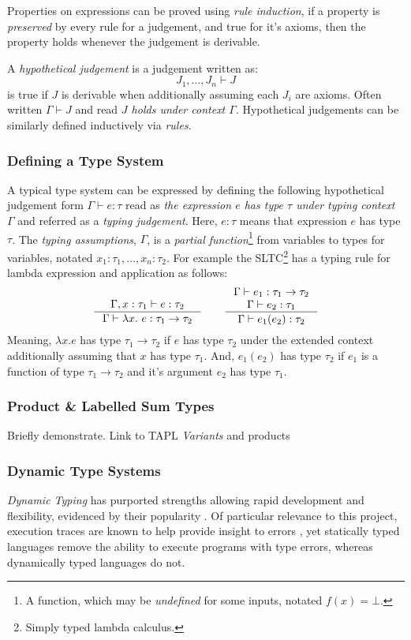 Properties on expressions can be proved using \textit{rule induction}, if a property is \textit{preserved} by every rule for a judgement, and true for it's axioms, then the property holds whenever the judgement is derivable.

A \textit{hypothetical judgement} is a judgement written as: 
\[J_1, \dots, J_n \vdash J\]
is true if $J$ is derivable when additionally assuming each $J_i$ are axioms. Often written $\Gamma \vdash J$ and read \textit{$J$ holds under context $\Gamma$}. Hypothetical judgements can be similarly defined inductively via \textit{rules}.

\subsubsection{Defining a Type System}\label{sec:TypingJudgements}
A typical type system can be expressed by defining the following hypothetical judgement form $\Gamma \vdash e : \tau$ read as \textit{the expression $e$ has type $\tau$ under typing context $\Gamma$} and referred as a \textit{typing judgement}. Here, $e : \tau$ means that expression $e$ has type $\tau$.  The \textit{typing assumptions}, $\Gamma$, is a \textit{partial function}\footnote{A function, which may be \textit{undefined} for some inputs, notated $f(x) = \bot$.} \cite{PartialFunctions} from variables to types for variables, notated $x_1 : \tau_1, \dots, x_n : \tau_2$. For example the SLTC\footnote{Simply typed lambda calculus.} \cite[ch. 9]{TAPL} has a typing rule for lambda expression and application as follows:
\[\inference{\Gamma, x : \tau_1 \vdash e : \tau_2}{\Gamma \vdash \lambda x.\ e : \tau_1 \to \tau_2} \qquad \inference{\Gamma \vdash e_1 : \tau_1 \to \tau_2\\ \Gamma \vdash e_2 : \tau_1}{\Gamma \vdash e_1(e_2) : \tau_2}\]
Meaning, $\lambda x. e$ has type $\tau_1 \to \tau_2$ if $e$ has type $\tau_2$ under the extended context additionally assuming that $x$ has type $\tau_1$.
And, $e_1(e_2)$ has type $\tau_2$ if $e_1$ is a function of type $\tau_1 \to \tau_2$ and it's argument $e_2$ has type $\tau_1$.

\subsubsection{Product \& Labelled Sum Types}\label{sec:ADTs}
Briefly demonstrate. Link to TAPL \textit{Variants} and products

\subsubsection{Dynamic Type Systems}\label{sec:DynamicTypeSystem}
\textit{Dynamic Typing} has purported strengths allowing rapid development and flexibility, evidenced by their popularity \cite{DynamicLangShift, TIOBE}. Of particular relevance to this project, execution traces are known to help provide insight to errors \cite{TraceVisualisation}, yet statically typed languages remove the ability to execute programs with type errors, whereas dynamically typed languages do not.\par 

